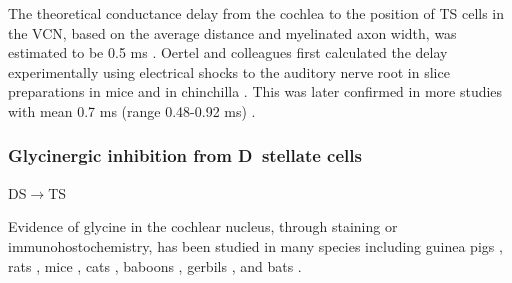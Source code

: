  The theoretical conductance delay from the cochlea to the position of TS cells in
 the VCN, based on the average distance and myelinated axon width, was estimated to
 be 0.5 ms \citep{Brown:1993,BrownLedwith:1990}.  Oertel and colleagues first
 calculated the delay experimentally using electrical shocks to the auditory nerve
 root in slice preparations in mice \citep[0.7 ms][]{Oertel:1983} and in chinchilla
 \citep[0.5 ms][]{WickesbergOertel:1993}. This was later confirmed in more studies
 with mean 0.7 ms (range 0.48-0.92 ms) \citep[mice][]{FerragamoGoldingEtAl:1998a}.



 \subsubsection{Glycinergic inhibition from D~stellate cells}

 DS\ensuremath{\rightarrow}TS




 Evidence of glycine in the cochlear nucleus, through staining or
 immunohostochemistry, has been studied in many species including guinea pigs
 \citep{JuizHelfertEtAl:1996a,HelfertBonneauEtAl:1989,Wenthold:1987,WentholdHuieEtAl:1987,AltschulerBetzEtAl:1986,SaintBensonEtAl:1991,KolstonOsenEtAl:1992,PeyretCampistronEtAl:1987,Alibardi:2003a,MahendrasingamWallamEtAl:2004,MahendrasingamWallamEtAl:2000,BabalianJacommeEtAl:2002},
 rats
 \citep{OsenLopezEtAl:1991,Mugnaini:1985,AokiSembaEtAl:1988,GatesWeedmanEtAl:1996,Alibardi:2003,LimOleskevichEtAl:2003,SrinivasanFriaufEtAl:2004,DoucetRossEtAl:1999},
 mice \citep{WickesbergWhitlonEtAl:1991,LimOleskevichEtAl:2003,YangDoievEtAl:2002},
 cats \citep{OsenOttersenEtAl:1990,SmithRhode:1989}, baboons
 \citep{MooreOsenEtAl:1996}, gerbils \citep{GleichVater:1998}, and bats
 \citep{KemmerVater:2001a}.







